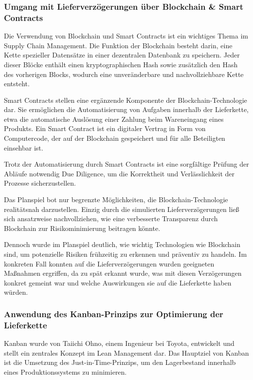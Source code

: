 \documentclass[a4paper,12pt]{article}
\begin{document}

\subsubsection{Umgang mit Lieferverzögerungen über Blockchain \& Smart Contracts}
Die Verwendung von Blockchain und Smart Contracts ist ein wichtiges Thema im Supply Chain Management.
Die Funktion der Blockchain besteht darin, eine Kette spezieller Datensätze in einer dezentralen Datenbank zu speichern.
Jeder dieser Blöcke enthält einen kryptographischen Hash sowie zusätzlich den Hash des vorherigen Blocks, wodurch eine unveränderbare und nachvollziehbare Kette entsteht.

Smart Contracts stellen eine ergänzende Komponente der Blockchain-Technologie dar.
Sie ermöglichen die Automatisierung von Aufgaben innerhalb der Lieferkette, etwa die automatische Auslösung einer Zahlung beim Wareneingang eines Produkts.
Ein Smart Contract ist ein digitaler Vertrag in Form von Computercode, der auf der Blockchain gespeichert und für alle Beteiligten einsehbar ist.

Trotz der Automatisierung durch Smart Contracts ist eine sorgfältige Prüfung der Abläufe notwendig Due Diligence,
um die Korrektheit und Verlässlichkeit der Prozesse sicherzustellen.

Das Planspiel bot nur begrenzte Möglichkeiten, die Blockchain-Technologie realitätsnah darzustellen.
Einzig durch die simulierten Lieferverzögerungen ließ sich ansatzweise nachvollziehen, wie eine verbesserte Transparenz durch Blockchain zur Risikominimierung beitragen könnte.

Dennoch wurde im Planspiel deutlich, wie wichtig Technologien wie Blockchain sind, um potenzielle Risiken frühzeitig zu erkennen und präventiv zu handeln.
Im konkreten Fall konnten auf die Lieferverzögerungen wurden geeigneten Maßnahmen ergriffen,
da zu spät erkannt wurde, was mit diesen Verzögerungen konkret gemeint war und welche Auswirkungen sie auf die Lieferkette haben würden.
\subsubsection{Anwendung des Kanban-Prinzips zur Optimierung der Lieferkette}
Kanban wurde von Taiichi Ohno, einem Ingenieur bei Toyota, entwickelt und stellt ein zentrales Konzept im Lean Management dar.
Das Hauptziel von Kanban ist die Umsetzung des Just-in-Time-Prinzips, um den Lagerbestand innerhalb eines Produktionssystems zu minimieren.
\end{document}

